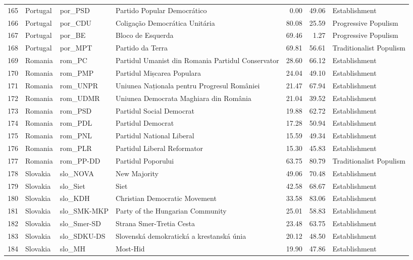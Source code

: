\begin{longtable}[c]{@{\extracolsep{\fill}}rlllrrl}
		165 & Portugal & por\_PSD & Partido Popular Democrático & 0.00 & 49.06 & Establishment \\
		166 & Portugal & por\_CDU & Coligação Democrática Unitária & 80.08 & 25.59 & Progressive Populism \\
		167 & Portugal & por\_BE & Bloco de Esquerda & 69.46 & 1.27 & Progressive Populism \\
		168 & Portugal & por\_MPT & Partido da Terra & 69.81 & 56.61 & Traditionalist Populism \\
		169 & Romania & rom\_PC & Partidul Umanist din Romania Partidul Conservator & 28.60 & 66.12 & Establishment \\
		170 & Romania & rom\_PMP & Partidul Mișcarea Populara & 24.04 & 49.10 & Establishment \\
		171 & Romania & rom\_UNPR & Uniunea Naționala pentru Progresul României & 21.47 & 67.94 & Establishment \\
		172 & Romania & rom\_UDMR & Uniunea Democrata Maghiara din România & 21.04 & 39.52 & Establishment \\
		173 & Romania & rom\_PSD & Partidul Social Democrat & 19.88 & 62.72 & Establishment \\
		174 & Romania & rom\_PDL & Partidul Democrat & 17.28 & 50.94 & Establishment \\
		175 & Romania & rom\_PNL & Partidul National Liberal & 15.59 & 49.34 & Establishment \\
		176 & Romania & rom\_PLR & Partidul Liberal Reformator & 15.30 & 45.83 & Establishment \\
		177 & Romania & rom\_PP-DD & Partidul Poporului & 63.75 & 80.79 & Traditionalist Populism \\
		178 & Slovakia & slo\_NOVA & New Majority & 49.06 & 70.48 & Establishment \\
		179 & Slovakia & slo\_Siet & Siet & 42.58 & 68.67 & Establishment \\
		180 & Slovakia & slo\_KDH & Christian Democratic Movement & 33.58 & 83.06 & Establishment \\
		181 & Slovakia & slo\_SMK-MKP & Party of the Hungarian Community & 25.01 & 58.83 & Establishment \\
		182 & Slovakia & slo\_Smer-SD & Strana Smer-Tretia Cesta & 23.48 & 63.75 & Establishment \\
		183 & Slovakia & slo\_SDKU-DS & Slovenská demokratická a krestanská únia & 20.12 & 48.50 & Establishment \\
		184 & Slovakia & slo\_MH & Most-Hid & 19.90 & 47.86 & Establishment \\

\end{longtable}
